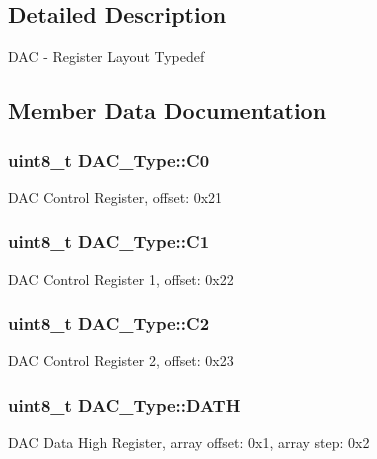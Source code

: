 \subsection{Detailed Description}
D\+AC -\/ Register Layout Typedef 

\subsection{Member Data Documentation}
\subsubsection[{\texorpdfstring{C0}{C0}}]{ uint8\+\_\+t D\+A\+C\+\_\+\+Type\+::\+C0}\hypertarget{structDAC__Type_a49f8406d0fa0efc705eb2c0c43ecf30c}{}\label{structDAC__Type_a49f8406d0fa0efc705eb2c0c43ecf30c}
D\+AC Control Register, offset\+: 0x21 
\subsubsection[{\texorpdfstring{C1}{C1}}]{ uint8\+\_\+t D\+A\+C\+\_\+\+Type\+::\+C1}\hypertarget{structDAC__Type_afb00f6857479eca5081afacc76b9b621}{}\label{structDAC__Type_afb00f6857479eca5081afacc76b9b621}
D\+AC Control Register 1, offset\+: 0x22 
\subsubsection[{\texorpdfstring{C2}{C2}}]{ uint8\+\_\+t D\+A\+C\+\_\+\+Type\+::\+C2}\hypertarget{structDAC__Type_a4128157a759ed11a7ac5b3daf56cd7d2}{}\label{structDAC__Type_a4128157a759ed11a7ac5b3daf56cd7d2}
D\+AC Control Register 2, offset\+: 0x23 
\subsubsection[{\texorpdfstring{D\+A\+TH}{DATH}}]{ uint8\+\_\+t D\+A\+C\+\_\+\+Type\+::\+D\+A\+TH}\hypertarget{structDAC__Type_ad8322a8c7a81901521c43219cb6fbca6}{}\label{structDAC__Type_ad8322a8c7a81901521c43219cb6fbca6}
D\+AC Data High Register, array offset\+: 0x1, array step\+: 0x2 
